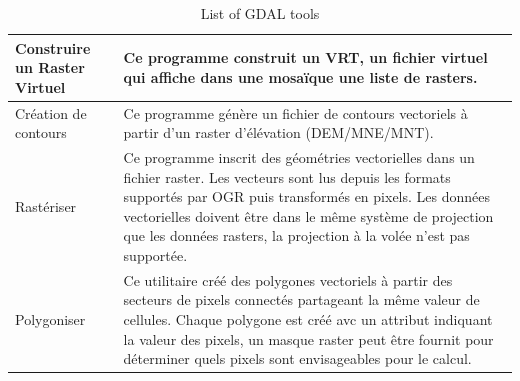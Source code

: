 {\setlength{\extrarowheight}{15pt}
\begin{longtable}{|p{3cm}|p{13cm}|}
\caption{List of GDAL tools}\label{tab:gdaltools} \\
\hline Construire un Raster Virtuel & Ce programme construit un VRT, un fichier virtuel qui affiche dans une mosaïque une liste de rasters. \\
\hline Création de contours & Ce programme génère un fichier de contours vectoriels à partir d'un raster d'élévation (DEM/MNE/MNT).\\
\hline Rastériser & Ce programme inscrit des géométries vectorielles dans un fichier raster. Les vecteurs sont lus depuis les formats supportés par OGR puis transformés en pixels. Les données vectorielles doivent être dans le même système de projection que les données rasters, la projection à la volée n'est pas supportée.\\
\hline Polygoniser & Ce utilitaire créé des polygones vectoriels à partir des secteurs de pixels connectés partageant la même valeur de cellules. Chaque polygone est créé avc un attribut indiquant la valeur des pixels, un masque raster peut être fournit pour déterminer quels pixels sont envisageables pour le calcul.\\

\end{longtable}}
